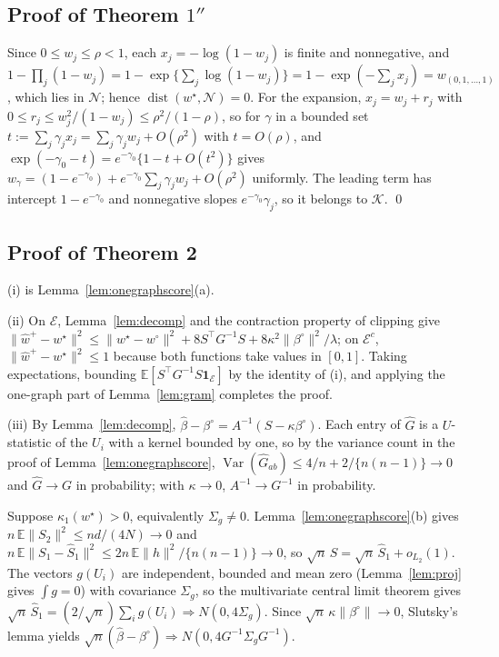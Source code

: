 \documentclass[12pt]{article}
\newcommand{\E}{\mathbb{E}}
\newcommand{\calK}{\mathcal{K}}
\newcommand{\calN}{\mathcal{N}}
\newcommand{\dist}{\operatorname{dist}}
\newcommand{\norm}[1]{\|#1\|}
\newcommand{\wstar}{w^{\star}}
\newcommand{\wproj}{w^{\circ}}
\newcommand{\bproj}{\beta^{\circ}}
\newcommand{\whatp}{\hat w^{+}}
\newcommand{\bhat}{\hat\beta}
\newcommand{\Ghat}{\hat G}
\newcommand{\ind}{\mathbf{1}}
\begin{document}
\subsection*{Proof of Theorem $1''$}
Since $0\le w_j\le\rho<1$, each $x_j=-\log(1-w_j)$ is finite and nonnegative, and $1-\prod_{j}(1-w_j)=1-\exp\{\sum_j\log(1-w_j)\}=1-\exp(-\sum_jx_j)=w_{(0,1,\dots,1)}$, which lies in $\calN$; hence $\dist(\wstar,\calN)=0$. For the expansion, $x_j=w_j+r_j$ with $0\le r_j\le w_j^2/(1-w_j)\le\rho^2/(1-\rho)$, so for $\gamma$ in a bounded set $t:=\sum_j\gamma_jx_j=\sum_j\gamma_jw_j+O(\rho^2)$ with $t=O(\rho)$, and $\exp(-\gamma_0-t)=e^{-\gamma_0}\{1-t+O(t^2)\}$ gives $w_\gamma=(1-e^{-\gamma_0})+e^{-\gamma_0}\sum_j\gamma_jw_j+O(\rho^2)$ uniformly. The leading term has intercept $1-e^{-\gamma_0}$ and nonnegative slopes $e^{-\gamma_0}\gamma_j$, so it belongs to $\calK$. \qed

\subsection*{Proof of Theorem 2}

(i) is Lemma~\ref{lem:onegraphscore}(a).

(ii) On $\mathcal{E}$, Lemma~\ref{lem:decomp} and the contraction property of clipping give $\norm{\whatp-\wstar}^2\le\norm{\wstar-\wproj}^2+8S^{\top}G^{-1}S+8\kappa^2\norm{\bproj}^2/\lambda$; on $\mathcal{E}^c$, $\norm{\whatp-\wstar}^2\le1$ because both functions take values in $[0,1]$. Taking expectations, bounding $\E[S^{\top}G^{-1}S\ind_{\mathcal{E}}]$ by the identity of (i), and applying the one-graph part of Lemma~\ref{lem:gram} completes the proof.

(iii) By Lemma~\ref{lem:decomp}, $\bhat-\bproj=A^{-1}(S-\kappa\bproj)$. Each entry of $\Ghat$ is a $U$-statistic of the $U_i$ with a kernel bounded by one, so by the variance count in the proof of Lemma~\ref{lem:onegraphscore}, $\operatorname{Var}(\Ghat_{ab})\le4/n+2/\{n(n-1)\}\to0$ and $\Ghat\to G$ in probability; with $\kappa\to0$, $A^{-1}\to G^{-1}$ in probability.

Suppose $\kappa_1(\wstar)>0$, equivalently $\Sigma_g\neq0$. Lemma~\ref{lem:onegraphscore}(b) gives $n\,\E\norm{S_2}^2\le nd/(4N)\to0$ and $n\,\E\norm{S_1-\hat S_1}^2\le2n\,\E\norm h^2/\{n(n-1)\}\to0$, so $\sqrt n\,S=\sqrt n\,\hat S_1+o_{L_2}(1)$. The vectors $g(U_i)$ are independent, bounded and mean zero (Lemma~\ref{lem:proj} gives $\int g=0$) with covariance $\Sigma_g$, so the multivariate central limit theorem gives $\sqrt n\,\hat S_1=(2/\sqrt n)\sum_ig(U_i)\Rightarrow N(0,4\Sigma_g)$. Since $\sqrt n\,\kappa\norm{\bproj}\to0$, Slutsky's lemma yields $\sqrt n(\bhat-\bproj)\Rightarrow N(0,4G^{-1}\Sigma_gG^{-1})$.
\end{document}
